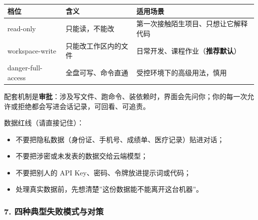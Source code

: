 {\def\LTcaptype{none} %
\begin{longtable}[]{@{}
  >{\raggedright\arraybackslash}p{}
  >{\raggedright\arraybackslash}p{}
  >{\raggedright\arraybackslash}p{}@{}}
\toprule\noalign{}
\begin{minipage}[b]{\linewidth}\raggedright
档位
\end{minipage} & \begin{minipage}[b]{\linewidth}\raggedright
含义
\end{minipage} & \begin{minipage}[b]{\linewidth}\raggedright
适用场景
\end{minipage} \\
\midrule\noalign{}
\endhead
\bottomrule\noalign{}
\endlastfoot
read-only & 只能读，不能改 & 第一次接触陌生项目、只想让它解释代码 \\
workspace-write & 只能改工作区内的文件 &
日常开发、课程作业（\textbf{推荐默认}） \\
danger-full-access & 全盘可写、命令直通 & 受控环境下的高级用法，慎用 \\
\end{longtable}
}

配套机制是\textbf{审批}：涉及写文件、跑命令、装依赖时，界面会先问你；你的每一次允许或拒绝都会写进会话记录，可回看、可追责。

数据红线（请直接记住）：

\begin{itemize}
\tightlist
\item
  不要把隐私数据（身份证、手机号、成绩单、医疗记录）贴进对话；
\item
  不要把涉密或未发表的数据交给云端模型；
\item
  不要把别人的 API Key、密码、令牌放进提示词或代码；
\item
  处理真实数据前，先想清楚''这份数据能不能离开这台机器''。
\end{itemize}

\subsubsection{7.
四种典型失败模式与对策}\label{ux56dbux79cdux5178ux578bux5931ux8d25ux6a21ux5f0fux4e0eux5bf9ux7b56}

